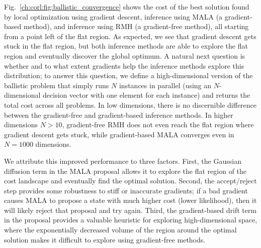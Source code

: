 Fig.~\ref{ch:corl:fig:ballistic_convergence} shows the cost of the best solution found by local optimization using gradient descent, inference using MALA (a gradient-based method), and inference using RMH (a gradient-free method), all starting from a point left of the flat region. As expected, we see that gradient descent gets stuck in the flat region, but both inference methods are able to explore the flat region and eventually discover the global optimum. A natural next question is whether and to what extent gradients help the inference methods explore this distribution; to answer this question, we define a high-dimensional version of the ballistic problem that simply runs $N$ instances in parallel (using an $N$-dimensional decision vector with one element for each instance) and returns the total cost across all problems. In low dimensions, there is no discernible difference between the gradient-free and gradient-based inference methods. In higher dimensions $N > 10$, gradient-free RMH does not even reach the flat region where gradient descent gets stuck, while gradient-based MALA converges even in $N=1000$ dimensions.

We attribute this improved performance to three factors. First, the Gaussian diffusion term in the MALA proposal allows it to explore the flat region of the cost landscape and eventually find the optimal solution. Second, the accept/reject step provides some robustness to stiff or inaccurate gradients; if a bad gradient causes MALA to propose a state with much higher cost (lower likelihood), then it will likely reject that proposal and try again. Third, the gradient-based drift term in the proposal provides a valuable heuristic for exploring high-dimensional space, where the exponentially decreased volume of the region around the optimal solution makes it difficult to explore using gradient-free methods.


